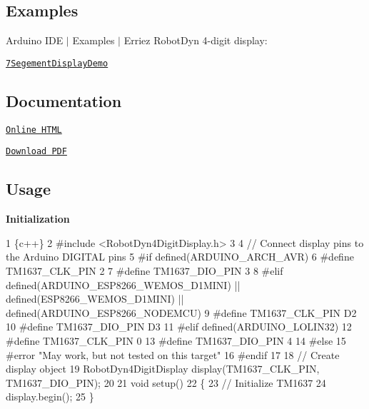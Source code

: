 \subsection*{Examples}

Arduino I\+DE $\vert$ Examples $\vert$ Erriez Robot\+Dyn 4-\/digit display\+:


\begin{DoxyItemize}
\item \href{https://github.com/Erriez/ErriezRobotDyn4DigitDisplay/blob/master/examples/7SegementDisplayDemo/7SegementDisplayDemo.ino}{\tt 7\+Segement\+Display\+Demo}
\end{DoxyItemize}

\subsection*{Documentation}


\begin{DoxyItemize}
\item \href{https://erriez.github.io/ErriezRobotDyn4DigitDisplay}{\tt Online H\+T\+ML}
\item \href{https://github.com/Erriez/ErriezRobotDyn4DigitDisplay/raw/gh-pages/latex/ErriezRobotDyn4DigitDisplay.pdf}{\tt Download P\+DF}
\end{DoxyItemize}

\subsection*{Usage}

{\bfseries Initialization}


\begin{DoxyCode}
1 \{c++\}
2 #include <RobotDyn4DigitDisplay.h>
3 
4 // Connect display pins to the Arduino DIGITAL pins
5 #if defined(ARDUINO\_ARCH\_AVR)
6 #define TM1637\_CLK\_PIN      2
7 #define TM1637\_DIO\_PIN      3
8 #elif defined(ARDUINO\_ESP8266\_WEMOS\_D1MINI) || defined(ESP8266\_WEMOS\_D1MINI) ||
       defined(ARDUINO\_ESP8266\_NODEMCU)
9 #define TM1637\_CLK\_PIN      D2
10 #define TM1637\_DIO\_PIN      D3
11 #elif defined(ARDUINO\_LOLIN32)
12 #define TM1637\_CLK\_PIN      0
13 #define TM1637\_DIO\_PIN      4
14 #else
15 #error "May work, but not tested on this target"
16 #endif
17 
18 // Create display object
19 RobotDyn4DigitDisplay display(TM1637\_CLK\_PIN, TM1637\_DIO\_PIN);
20 
21 void setup()
22 \{
23     // Initialize TM1637
24     display.begin();
25 \}
\end{DoxyCode}


